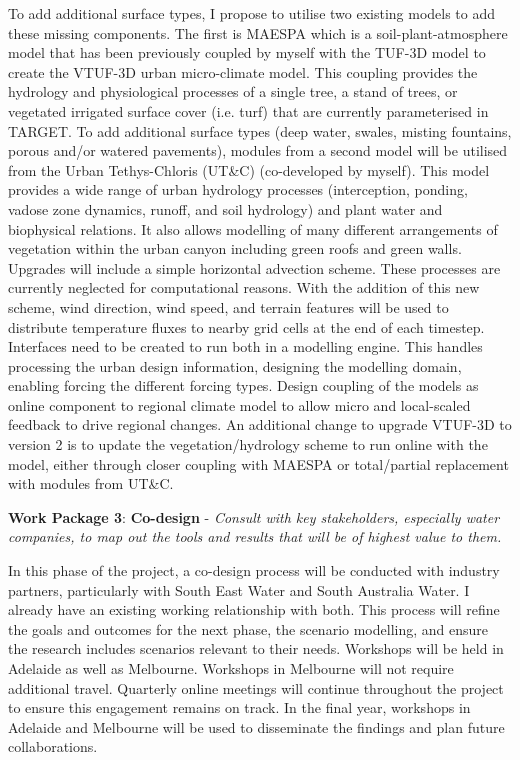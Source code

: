 To add additional surface types, I propose to utilise two existing models to add these missing components. The first is MAESPA\cite{Duursma2012} which is a soil-plant-atmosphere model that has been previously coupled by myself with the TUF-3D model\cite{Krayenhoff2007} to create the VTUF-3D\cite{Nice2018a} urban micro-climate model. This coupling provides the hydrology and physiological processes of a single tree, a stand of trees, or vegetated irrigated surface cover (i.e. turf) that are currently parameterised in TARGET. To add additional surface types (deep water, swales, misting fountains, porous and/or watered pavements), modules from a second model will be utilised from the Urban Tethys-Chloris (UT\&C)\cite{Meili2020} (co-developed by myself). This model provides a wide range of urban hydrology processes (interception, ponding, vadose zone dynamics, runoff, and soil hydrology) and plant water and biophysical relations. It also allows modelling of many different arrangements of vegetation within the urban canyon including green roofs and green walls. Upgrades will include a simple horizontal advection scheme. These processes are currently neglected for computational reasons. With the addition of this new scheme, wind direction, wind speed, and terrain features will be used to distribute temperature fluxes to nearby grid cells at the end of each timestep. Interfaces need to be created to run both in a modelling engine. This handles processing the urban design information, designing the modelling domain, enabling forcing the different forcing types. Design coupling of the models as online component to regional climate model to allow micro and local-scaled feedback to drive regional changes. An additional change to upgrade VTUF-3D to version 2 is to update the vegetation/hydrology scheme to run online with the model, either through closer coupling with MAESPA\cite{Duursma2012} or total/partial replacement with modules from UT\&C\cite{Meili2020}. 

\textbf{Work Package 3}: \textbf{Co-design} - \emph{Consult with key stakeholders, especially water companies, to map out the tools and results that will be of highest value to them. }

In this phase of the project, a co-design process will be conducted with industry partners, particularly with South East Water and South Australia Water. I already have an existing working relationship with both. This process will refine the goals and outcomes for the next phase, the scenario modelling, and ensure the research includes scenarios relevant to their needs. Workshops will be held in Adelaide as well as Melbourne. Workshops in Melbourne will not require additional travel. Quarterly online meetings will continue throughout the project to ensure this engagement remains on track. In the final year, workshops in Adelaide and Melbourne will be used to disseminate the findings and plan future collaborations.


